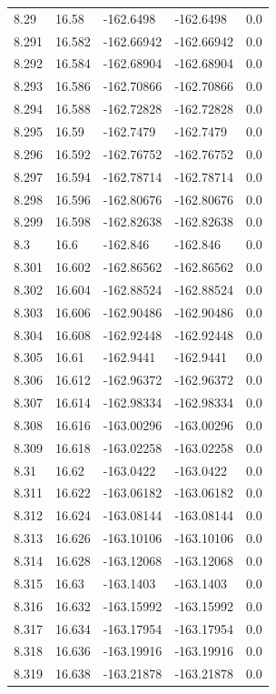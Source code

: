 \begin{tabular}{lllll}
8.29 & 16.58 & -162.6498 & -162.6498 & 0.0 \\
8.291 & 16.582 & -162.66942 & -162.66942 & 0.0 \\
8.292 & 16.584 & -162.68904 & -162.68904 & 0.0 \\
8.293 & 16.586 & -162.70866 & -162.70866 & 0.0 \\
8.294 & 16.588 & -162.72828 & -162.72828 & 0.0 \\
8.295 & 16.59 & -162.7479 & -162.7479 & 0.0 \\
8.296 & 16.592 & -162.76752 & -162.76752 & 0.0 \\
8.297 & 16.594 & -162.78714 & -162.78714 & 0.0 \\
8.298 & 16.596 & -162.80676 & -162.80676 & 0.0 \\
8.299 & 16.598 & -162.82638 & -162.82638 & 0.0 \\
8.3 & 16.6 & -162.846 & -162.846 & 0.0 \\
8.301 & 16.602 & -162.86562 & -162.86562 & 0.0 \\
8.302 & 16.604 & -162.88524 & -162.88524 & 0.0 \\
8.303 & 16.606 & -162.90486 & -162.90486 & 0.0 \\
8.304 & 16.608 & -162.92448 & -162.92448 & 0.0 \\
8.305 & 16.61 & -162.9441 & -162.9441 & 0.0 \\
8.306 & 16.612 & -162.96372 & -162.96372 & 0.0 \\
8.307 & 16.614 & -162.98334 & -162.98334 & 0.0 \\
8.308 & 16.616 & -163.00296 & -163.00296 & 0.0 \\
8.309 & 16.618 & -163.02258 & -163.02258 & 0.0 \\
8.31 & 16.62 & -163.0422 & -163.0422 & 0.0 \\
8.311 & 16.622 & -163.06182 & -163.06182 & 0.0 \\
8.312 & 16.624 & -163.08144 & -163.08144 & 0.0 \\
8.313 & 16.626 & -163.10106 & -163.10106 & 0.0 \\
8.314 & 16.628 & -163.12068 & -163.12068 & 0.0 \\
8.315 & 16.63 & -163.1403 & -163.1403 & 0.0 \\
8.316 & 16.632 & -163.15992 & -163.15992 & 0.0 \\
8.317 & 16.634 & -163.17954 & -163.17954 & 0.0 \\
8.318 & 16.636 & -163.19916 & -163.19916 & 0.0 \\
8.319 & 16.638 & -163.21878 & -163.21878 & 0.0 \\

\end{tabular}
